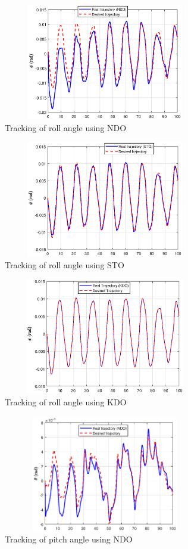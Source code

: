 \documentclass[letterpaper%
, twoside%
, 12pt%
,memoire%
, english%
,creativecommons,hyperref%
]{thETS}
\begin{document}
\begin{figure}[H]
\centering
\includegraphics[width=3.5in,height=2in]{Figures/results/tracking/roll_trac_dis_m1_ndo.eps}
\caption{Tracking of roll angle using NDO}
\label{roll_trac_dis_m1_ndo}
\end{figure}

\begin{figure}[H]
\centering
\includegraphics[width=3.5in,height=2in]{Figures/results/tracking/roll_trac_dis_m1_sto.eps}
\caption{Tracking of roll angle using STO}
\label{roll_trac_dis_m1_sto}
\end{figure}

\begin{figure}[H]
\centering
\includegraphics[width=3.5in,height=2in]{Figures/results/tracking/roll_trac_dis_m1_kdo.eps}
\caption{Tracking of roll angle using KDO}
\label{roll_trac_dis_m1_kdo}
\end{figure}

\begin{figure}[H]
\centering
\includegraphics[width=3.5in,height=2in]{Figures/results/tracking/pitch_trac_dis_m1_ndo.eps}
\caption{Tracking of pitch angle using NDO}
\label{pitch_trac_dis_m1_ndo}
\end{figure}
\end{document}
